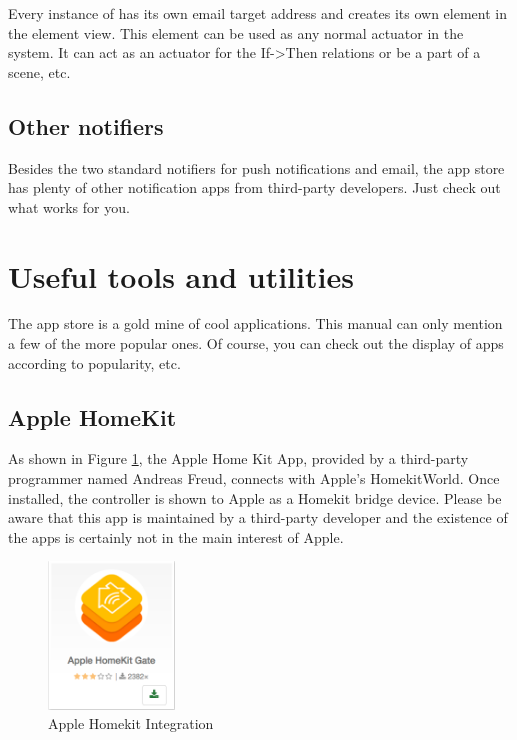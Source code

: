Every instance of  has its own email target address and creates its own 
element in the element view. This element can be used as any normal actuator in the \zway 
system. It can act as an actuator for the If->Then relations or be a part of a scene, etc.

\subsection{Other notifiers}

Besides the two standard notifiers for push notifications and email, the app store has 
plenty of other notification apps from third-party developers. Just check out what works for you.

\section{Useful tools and utilities}

The app store is a gold mine of cool applications. This manual can only mention a few of 
the more popular ones. Of course, you can check out the display of apps according to popularity, etc.

\subsection{Apple HomeKit}

As shown in Figure \ref{app40}, the Apple Home Kit App, provided by a third-party programmer 
named Andreas Freud, connects \zway with Apple’s HomekitWorld. Once installed, the \zway 
controller is shown to Apple as a Homekit bridge device. Please be aware that this app is 
maintained by a third-party developer and the existence of the apps is certainly not in 
the main interest of Apple.

\begin{figure}
\begin{center}
\includegraphics[width=0.3\textwidth]{pngs/cap6/app40.png}
\caption{Apple Homekit Integration}
\label{app40}
\end{center}
\end{figure}

